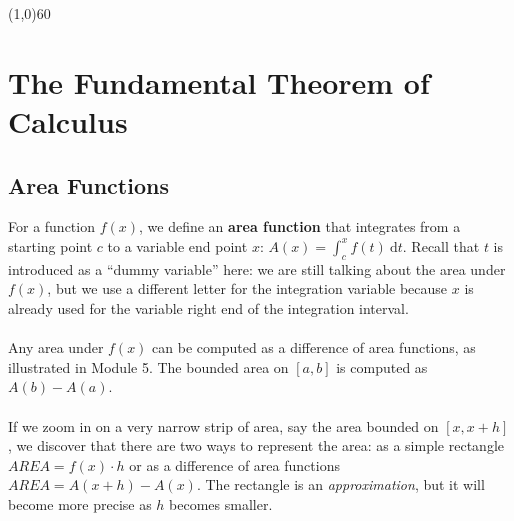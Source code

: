 \documentclass[10.5pt,twoside]{report}
\theoremstyle{definition}
\begin{document}
\line(1,0){60}
\linethickness{0.5mm}

\pagebreak



\section{The Fundamental Theorem of Calculus}\label{The Fundamental Theorem of Calculus}

\subsection{Area Functions}

For a function $f(x)$, we define an \textbf{area function} that integrates from a starting point $c$ to a variable end point $x$: $A(x)=\displaystyle \int_c^x f(t) \ \mathrm{d}t$.  Recall that $t$ is introduced as a ``dummy variable'' here: we are still talking about the area under $f(x)$, but we use a different letter for the integration variable because $x$ is already used for the variable right end of the integration interval. \\
${}$\\
Any area under $f(x)$ can be computed as a difference of area functions, as illustrated in  Module 5.  The bounded area on $[a,b]$ is computed as $A(b)-A(a)$.\\
${}$\\
If we zoom in on a very narrow strip of area, say the area bounded on $[x,x+h]$, we discover that there are two ways to represent the area:  as a simple rectangle $AREA=f(x)\cdot h$ or as a difference of area functions $AREA=A(x+h)-A(x)$.  The rectangle is an \textit{approximation}, but it will become more precise as $h$ becomes smaller.
\end{document}
